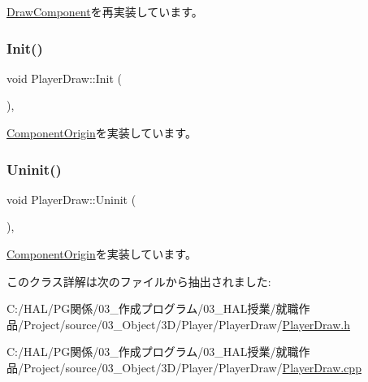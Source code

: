 \mbox{\hyperlink{class_draw_component_a03b739c28b9abcff3a3e5bda6bcc2060}{Draw\+Component}}を再実装しています。

\mbox{\label{class_player_draw_ad79a0fbeb618e0913822b573e5d0be68}} 
\subsubsection{\texorpdfstring{Init()}{Init()}}
{\footnotesize\ttfamily void Player\+Draw\+::\+Init (\begin{DoxyParamCaption}{ }\end{DoxyParamCaption})\hspace{0.3cm}{\ttfamily [override]}, {\ttfamily [virtual]}}



\mbox{\hyperlink{class_component_origin_a9f674891257f2272b1636d8b6bb05d81}{Component\+Origin}}を実装しています。

\mbox{\label{class_player_draw_a917b2947914287f23d87ca75cd68f553}} 
\subsubsection{\texorpdfstring{Uninit()}{Uninit()}}
{\footnotesize\ttfamily void Player\+Draw\+::\+Uninit (\begin{DoxyParamCaption}{ }\end{DoxyParamCaption})\hspace{0.3cm}{\ttfamily [override]}, {\ttfamily [virtual]}}



\mbox{\hyperlink{class_component_origin_a9f89a93f9c1954bd53f9750e35e6089d}{Component\+Origin}}を実装しています。



このクラス詳解は次のファイルから抽出されました\+:\begin{DoxyCompactItemize}
\item 
C\+:/\+H\+A\+L/\+P\+G関係/03\+\_\+作成プログラム/03\+\_\+\+H\+A\+L授業/就職作品/\+Project/source/03\+\_\+\+Object/3\+D/\+Player/\+Player\+Draw/\mbox{\hyperlink{_player_draw_8h}{Player\+Draw.\+h}}\item 
C\+:/\+H\+A\+L/\+P\+G関係/03\+\_\+作成プログラム/03\+\_\+\+H\+A\+L授業/就職作品/\+Project/source/03\+\_\+\+Object/3\+D/\+Player/\+Player\+Draw/\mbox{\hyperlink{_player_draw_8cpp}{Player\+Draw.\+cpp}}\end{DoxyCompactItemize}
